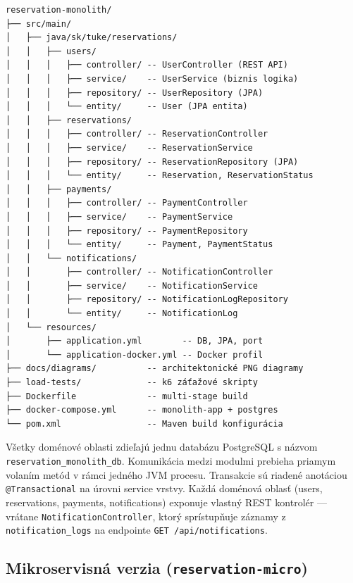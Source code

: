 \begin{verbatim}
reservation-monolith/
├── src/main/
│   ├── java/sk/tuke/reservations/
│   │   ├── users/
│   │   │   ├── controller/ -- UserController (REST API)
│   │   │   ├── service/    -- UserService (biznis logika)
│   │   │   ├── repository/ -- UserRepository (JPA)
│   │   │   └── entity/     -- User (JPA entita)
│   │   ├── reservations/
│   │   │   ├── controller/ -- ReservationController
│   │   │   ├── service/    -- ReservationService
│   │   │   ├── repository/ -- ReservationRepository (JPA)
│   │   │   └── entity/     -- Reservation, ReservationStatus
│   │   ├── payments/
│   │   │   ├── controller/ -- PaymentController
│   │   │   ├── service/    -- PaymentService
│   │   │   ├── repository/ -- PaymentRepository
│   │   │   └── entity/     -- Payment, PaymentStatus
│   │   └── notifications/
│   │       ├── controller/ -- NotificationController
│   │       ├── service/    -- NotificationService
│   │       ├── repository/ -- NotificationLogRepository
│   │       └── entity/     -- NotificationLog
│   └── resources/
│       ├── application.yml        -- DB, JPA, port
│       └── application-docker.yml -- Docker profil
├── docs/diagrams/          -- architektonické PNG diagramy
├── load-tests/             -- k6 záťažové skripty
├── Dockerfile              -- multi-stage build
├── docker-compose.yml      -- monolith-app + postgres
└── pom.xml                 -- Maven build konfigurácia
\end{verbatim}

Všetky doménové oblasti zdieľajú jednu databázu PostgreSQL s názvom \\ \texttt{reservation\_monolith\_db}. Komunikácia medzi modulmi prebieha priamym volaním metód v rámci jedného JVM procesu. Transakcie sú riadené anotáciou \texttt{@Transactional} na úrovni service vrstvy. Každá doménová oblasť (users, reservations, payments, notifications) exponuje vlastný REST kontrolér — vrátane \texttt{NotificationController}, ktorý sprístupňuje záznamy z \texttt{notification\_logs} na endpointe \texttt{GET /api/notifications}.

\subsection*{Mikroservisná verzia (\texttt{reservation-micro})}

